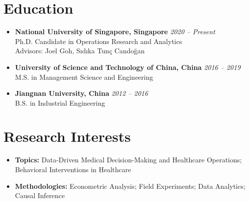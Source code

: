 \documentclass[12pt, a4paper]{article}
\begin{document}
{\small

\section*{Education}

\begin{itemize}

	\item[]
	\textbf{National University of Singapore, Singapore} \hfill \textit{2020 -- Present} \\
	Ph.D. Candidate in Operations Research and Analytics \\
	Advisors: Joel Goh, S\i{}d\i{}ka Tun\c{c} Cando\u{g}an

	\item[]
	\textbf{University of Science and Technology of China, China} \hfill \textit{2016 -- 2019} \\
	M.S. in Management Science and Engineering

	\item[]
	\textbf{Jiangnan University, China} \hfill \textit{2012 -- 2016} \\
	B.S. in Industrial Engineering

\end{itemize}




\section*{Research Interests}

\begin{itemize}
    \item[] \textbf{Topics:} Data-Driven Medical Decision-Making and Healthcare Operations; Behavioral Interventions in Healthcare  
    \item[] \textbf{Methodologies:} Econometric Analysis; Field Experiments; Data Analytics; Causal Inference
\end{itemize}




}
\end{document}
